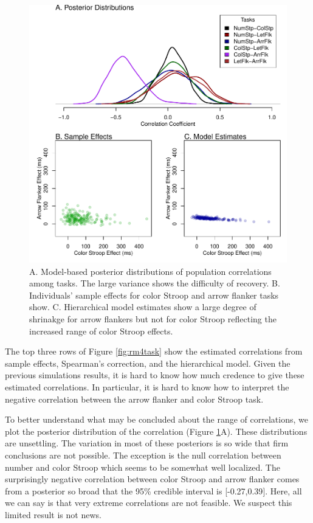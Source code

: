 \documentclass[
  ,man]{apa6}
\begin{document}
\begin{figure}
\centering
\includegraphics{p_files/figure-latex/rm4taskEst-1.pdf}
\caption{\label{fig:rm4taskEst}A. Model-based posterior distributions of population correlations among tasks. The large variance shows the difficulty of recovery. B. Individuals' sample effects for color Stroop and arrow flanker tasks show. C. Hierarchical model estimates show a large degree of shrinakge for arrow flankers but not for color Stroop reflecting the increased range of color Stroop effects.}
\end{figure}

The top three rows of Figure \ref{fig:rm4task} show the estimated correlations from sample effects, Spearman's correction, and the hierarchical model. Given the previous simulations results, it is hard to know how much credence to give these estimated correlations. In particular, it is hard to know how to interpret the negative correlation between the arrow flanker and color Stroop task.

To better understand what may be concluded about the range of correlations, we plot the posterior distribution of the correlation (Figure \ref{fig:rm4taskEst}A). These distributions are unsettling. The variation in most of these posteriors is so wide that firm conclusions are not possible. The exception is the null correlation between number and color Stroop which seems to be somewhat well localized. The surprisingly negative correlation between color Stroop and arrow flanker comes from a posterior so broad that the 95\% credible interval is {[}-0.27,0.39{]}. Here, all we can say is that very extreme correlations are not feasible. We suspect this limited result is not news.
\end{document}
